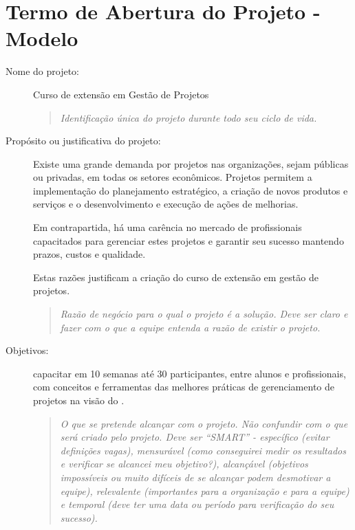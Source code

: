 \appendix
\newpage

\chapter{Termo de Abertura do Projeto - Modelo}

\begin{description}
	
	\item[Nome do projeto:] Curso de extensão em Gestão de Projetos
	
	\begin{quote}
	\emph{Identificação única do projeto durante todo seu ciclo de vida.}	
	\end{quote}
	
	\item[Propósito ou justificativa do projeto:] Existe uma grande demanda por projetos nas organizações, sejam públicas ou privadas, em todas os setores econômicos. Projetos permitem a implementação do planejamento estratégico, a criação de novos produtos e serviços e o desenvolvimento e execução de ações de melhorias.

	Em contrapartida, há uma carência no mercado de profissionais capacitados para gerenciar estes projetos e garantir seu sucesso mantendo prazos, custos e qualidade.

	Estas razões justificam a criação do curso de extensão em gestão de projetos.
	
	\begin{quote}
	\emph{Razão de negócio para o qual o projeto é a solução. Deve ser claro e fazer com o que a equipe entenda a razão de existir o projeto.}
	\end{quote}

	\item[Objetivos:] capacitar em 10 semanas até 30 participantes, entre alunos e profissionais, com conceitos e ferramentas das melhores práticas de gerenciamento de projetos na visão do \pmi.
	
	\begin{quote}
		\emph{O que se pretende alcançar com o projeto. Não confundir com o que será criado pelo projeto. Deve ser ``SMART'' - específico (evitar definições vagas), mensurável (como conseguirei medir os resultados e verificar se alcancei meu objetivo?), alcançável (objetivos impossíveis ou muito difíceis de se alcançar podem desmotivar a equipe), relevalente (importantes para a organização e para a equipe) e temporal (deve ter uma data ou período para verificação do seu sucesso).}
	\end{quote}


\end{description}
